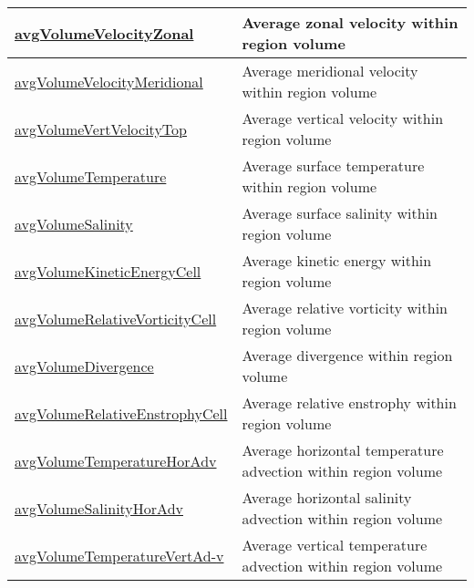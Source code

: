 {\begin{center}
\begin{longtable}{| p{2.0in} | p{4.0in} |}
    \hline
    \hyperref[subsec:var_sec_layerVolumeWeightedAverageAM_avgVolumeVelocityZonal]{avgVolumeVelocityZonal} & Average zonal velocity within region volume \\
    \hline
    \hyperref[subsec:var_sec_layerVolumeWeightedAverageAM_avgVolumeVelocityMeridional]{avgVolumeVelocityMeridional} & Average meridional velocity within region volume \\
    \hline
    \hyperref[subsec:var_sec_layerVolumeWeightedAverageAM_avgVolumeVertVelocityTop]{avgVolumeVertVelocityTop} & Average vertical velocity within region volume \\
    \hline
    \hyperref[subsec:var_sec_layerVolumeWeightedAverageAM_avgVolumeTemperature]{avgVolumeTemperature} & Average surface temperature within region volume \\
    \hline
    \hyperref[subsec:var_sec_layerVolumeWeightedAverageAM_avgVolumeSalinity]{avgVolumeSalinity} & Average surface salinity within region volume \\
    \hline
    \hyperref[subsec:var_sec_layerVolumeWeightedAverageAM_avgVolumeKineticEnergyCell]{avgVolumeKineticEnergyCell} & Average kinetic energy within region volume \\
    \hline
    \hyperref[subsec:var_sec_layerVolumeWeightedAverageAM_avgVolumeRelativeVorticityCell]{avgVolumeRelativeVorticityCell} & Average relative vorticity within region volume \\
    \hline
    \hyperref[subsec:var_sec_layerVolumeWeightedAverageAM_avgVolumeDivergence]{avgVolumeDivergence} & Average divergence within region volume \\
    \hline
    \hyperref[subsec:var_sec_layerVolumeWeightedAverageAM_avgVolumeRelativeEnstrophyCell]{avgVolumeRelativeEnstrophyCell} & Average relative enstrophy within region volume \\
    \hline
    \hyperref[subsec:var_sec_layerVolumeWeightedAverageAM_avgVolumeTemperatureHorAdv]{avgVolumeTemperatureHorAdv} & Average horizontal temperature advection within region volume \\
    \hline
    \hyperref[subsec:var_sec_layerVolumeWeightedAverageAM_avgVolumeSalinityHorAdv]{avgVolumeSalinityHorAdv} & Average horizontal salinity advection within region volume \\
    \hline
    \hyperref[subsec:var_sec_layerVolumeWeightedAverageAM_avgVolumeTemperatureVertAdv]{avgVolumeTemperatureVertAd-}\hyperref[subsec:var_sec_layerVolumeWeightedAverageAM_avgVolumeTemperatureVertAdv]{v}  & Average vertical temperature advection within region volume \\

\end{longtable}
\end{center}}
